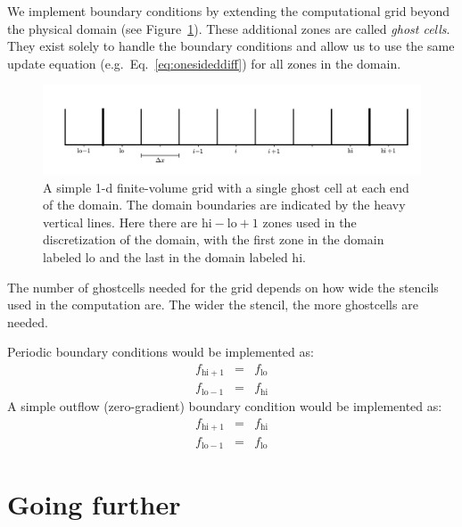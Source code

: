 We implement boundary conditions by extending the computational grid
beyond the physical domain (see Figure~\ref{fig:fv_gc}).  These
additional zones are called {\em ghost cells}.  They exist solely to
handle the boundary conditions and allow us to use the same update
equation (e.g.\ Eq.~\ref{eq:onesideddiff}) for all zones in the
domain.

\begin{figure}[t]
\centering
\includegraphics[width=\linewidth]{simplegrid_gc}
\caption[A simple 1-d finite-volume grid with ghost cells]
        {\label{fig:fv_gc} A simple 1-d finite-volume grid with a
          single ghost cell at each end of the domain.  The domain
          boundaries are indicated by the heavy vertical lines.  Here
          there are $\mathrm{hi}-\mathrm{lo}+1$ zones used in the
          discretization of the domain, with the first zone in the
          domain labeled $\mathrm{lo}$ and the last in the domain
          labeled $\mathrm{hi}$.}
\end{figure}

The number of ghostcells needed for the grid depends on how wide the
stencils used in the computation are.  The wider the stencil, the more
ghostcells are needed.

Periodic boundary conditions would be implemented as:
\begin{eqnarray}
f_{\mathrm{hi}+1} &=& f_\mathrm{lo} \\
f_{\mathrm{lo}-1} &=& f_\mathrm{hi}
\end{eqnarray}
A simple outflow (zero-gradient) boundary condition would be implemented as:
\begin{eqnarray}
f_{\mathrm{hi}+1} &=& f_\mathrm{hi} \\
f_{\mathrm{lo}-1} &=& f_\mathrm{lo}
\end{eqnarray}



\section{Going further}

